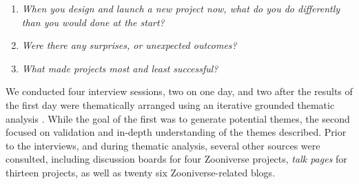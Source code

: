 \documentclass{sigchi}
\begin{document}
\begin{enumerate}[itemsep=1mm]
\item \emph{When you design and launch a new project now, what do you do differently than you would done at the start?}
\item \emph{Were there any surprises, or unexpected outcomes?}
\item \emph{What made projects most and least successful?}
\end{enumerate}

We conducted four interview sessions, two on one day, and two after the results of the first day were thematically arranged using an iterative grounded thematic analysis \cite{mazzolini2003sage}.  While the goal of the first was to generate potential themes, the second focused on validation and in-depth understanding of the themes described.  Prior to the interviews, and during thematic analysis, several other sources were consulted, including discussion boards for four Zooniverse projects, \emph{talk pages} for thirteen projects, as well as twenty six Zooniverse-related blogs. 



\end{document}
